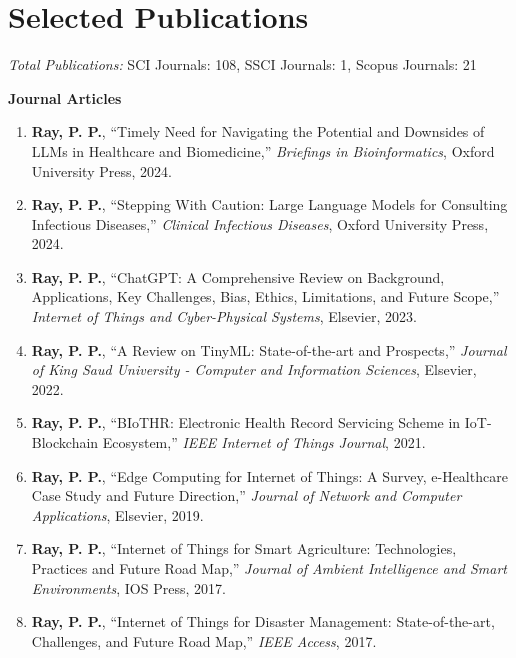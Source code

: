 \documentclass[10pt,a4paper]{article}
\begin{document}
	\section*{Selected Publications}
	
	\textit{Total Publications:} SCI Journals: 108, SSCI Journals: 1, Scopus Journals: 21
	
	\textbf{Journal Articles}
	\begin{enumerate}[leftmargin=0.2in]
		\item \textbf{Ray, P. P.}, “Timely Need for Navigating the Potential and Downsides of LLMs in Healthcare and Biomedicine,” \textit{Briefings in Bioinformatics}, Oxford University Press, 2024.
		\item \textbf{Ray, P. P.}, “Stepping With Caution: Large Language Models for Consulting Infectious Diseases,” \textit{Clinical Infectious Diseases}, Oxford University Press, 2024.
		\item \textbf{Ray, P. P.}, “ChatGPT: A Comprehensive Review on Background, Applications, Key Challenges, Bias, Ethics, Limitations, and Future Scope,” \textit{Internet of Things and Cyber-Physical Systems}, Elsevier, 2023.
		\item \textbf{Ray, P. P.}, “A Review on TinyML: State-of-the-art and Prospects,” \textit{Journal of King Saud University - Computer and Information Sciences}, Elsevier, 2022.
		\item \textbf{Ray, P. P.}, “BIoTHR: Electronic Health Record Servicing Scheme in IoT-Blockchain Ecosystem,” \textit{IEEE Internet of Things Journal}, 2021.
		\item \textbf{Ray, P. P.}, “Edge Computing for Internet of Things: A Survey, e-Healthcare Case Study and Future Direction,” \textit{Journal of Network and Computer Applications}, Elsevier, 2019.
		\item \textbf{Ray, P. P.}, “Internet of Things for Smart Agriculture: Technologies, Practices and Future Road Map,” \textit{Journal of Ambient Intelligence and Smart Environments}, IOS Press, 2017.
		\item \textbf{Ray, P. P.}, “Internet of Things for Disaster Management: State-of-the-art, Challenges, and Future Road Map,” \textit{IEEE Access}, 2017.
	\end{enumerate}
	
\end{document}
